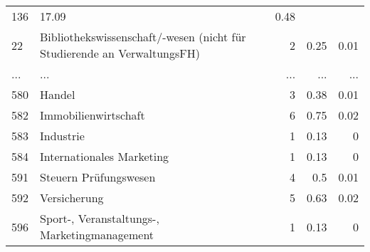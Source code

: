 \begin{longtable}{lXrrr}
          \num{136} &
          \num[round-mode=places,round-precision=2]{17,09} &
          \num[round-mode=places,round-precision=2]{0,48} \\
        22 & \multicolumn{1}{X}{Bibliothekswissenschaft/-wesen (nicht für Studierende an VerwaltungsFH)} & %
          \num{2} &
          \num[round-mode=places,round-precision=2]{0,25} &
          \num[round-mode=places,round-precision=2]{0,01} \\
       ... & ... & ... & ... & ... \\
        580 & \multicolumn{1}{X}{Handel} & %
          \num{3} &
          \num[round-mode=places,round-precision=2]{0,38} &
          \num[round-mode=places,round-precision=2]{0,01} \\

        582 & \multicolumn{1}{X}{Immobilienwirtschaft} & %
          \num{6} &
          \num[round-mode=places,round-precision=2]{0,75} &
          \num[round-mode=places,round-precision=2]{0,02} \\

        583 & \multicolumn{1}{X}{Industrie} & %
          \num{1} &
          \num[round-mode=places,round-precision=2]{0,13} &
          \num[round-mode=places,round-precision=2]{0} \\

        584 & \multicolumn{1}{X}{Internationales Marketing} & %
          \num{1} &
          \num[round-mode=places,round-precision=2]{0,13} &
          \num[round-mode=places,round-precision=2]{0} \\

        591 & \multicolumn{1}{X}{Steuern Prüfungswesen} & %
          \num{4} &
          \num[round-mode=places,round-precision=2]{0,5} &
          \num[round-mode=places,round-precision=2]{0,01} \\

        592 & \multicolumn{1}{X}{Versicherung} & %
          \num{5} &
          \num[round-mode=places,round-precision=2]{0,63} &
          \num[round-mode=places,round-precision=2]{0,02} \\

        596 & \multicolumn{1}{X}{Sport-, Veranstaltungs-, Marketingmanagement} & %
          \num{1} &
          \num[round-mode=places,round-precision=2]{0,13} &
          \num[round-mode=places,round-precision=2]{0} \\


\end{longtable}
